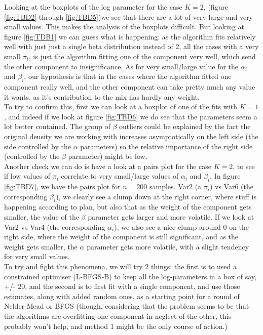\documentclass[10pt]{report}
\begin{document}
Looking at the boxplots of the log parameter for the case $K=2$, (figure \ref{fig:TBD2} through \ref{fig:TBD5})we see that there are a lot of very large and very small values. This makes the analysis of the boxplots difficult. But looking at figure \ref{fig:TDB1} we can guess what is happening: as the algorithm fits relatively well with just just a single beta distribution instead of 2, all the cases with a very small $\pi_i$, is just the algorithm fitting one of the component very well, which send the other component to insignificance. As for very small/large value for the $\alpha_i$ and $\beta_i$, our hypothesis is that in the cases where the algorithm fitted one component really well, and the other component can take pretty much any value it wants, as it's contribution to the mix has hardly any weight.
\\

To try to confirm this, first we can look at a boxplot of one of the fits with $K=1$, and indeed if we look at figure \ref{fig:TBD6} we do see that the parameters seem a lot better contained. The group of $\beta$ outliers could be explained by the fact the original density we are working with increases asymptotically on the left side (the side controlled by the $\alpha$ parameters) so the relative importance of the right side (controlled by the $\beta$ parameter) might be low. 
\\

Another check we can do is have a look at a pairs plot for the case $K=2$, to see if low values of $\pi_i$ correlate to very small/large values of $\alpha_i$ and $\beta_i$. In figure \ref{fig:TBD7}, we have the pairs plot for $n=200$ samples. Var2 (a $\pi_i$) vs Var6 (the corresponding $\beta_i$), we clearly see a clump down at the right corner, where stuff is happening according to plan, but also that as the weight of the component gets smaller, the value of the $\beta$ parameter gets larger and more volatile. If we look at Var2 vs Var4 (the corresponding $\alpha_i$), we also see a nice clump around $0$ on the right side, where the weight of the component is still significant, and as the weight gets smaller, the $\alpha$ parameter gets more volatile, with a slight tendency for very small values.
\\


To try and fight this phenomena, we will try 2 things: the first is to used a constrained optimiser (L-BFGS-B) to keep all the log-parameters in a box of say, +/- 20, and the second is to first fit with a single component, and use those estimates, along with added random ones, as a starting point for a round of Nelder-Mead or BFGS (though, considering that the problem seems to be that the algorithms are overfitting one component in neglect of the other, this probably won't help, and method 1 might be the only course of action.)
\end{document}
